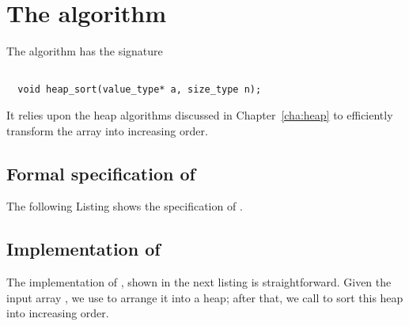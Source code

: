
\section{The \heapsort algorithm}

The \heapsort algorithm has the signature

\begin{lstlisting}[style = acsl-block]

  void heap_sort(value_type* a, size_type n);
\end{lstlisting}

It relies upon the heap algorithms discussed in Chapter~\ref{cha:heap}
to efficiently transform the array into increasing order.

\FloatBarrier

\subsection{Formal specification of \heapsort}

The following Listing shows the specification of \heapsort.




\subsection{Implementation of \heapsort}

The implementation of \heapsort, shown in the next listing is straightforward.
%
Given the input array , we use  to
arrange it into a heap; after that, we call  to
sort this heap into increasing order.



\clearpage

